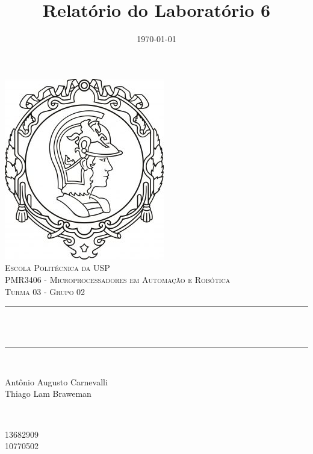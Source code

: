 \documentclass{article}
\title{Relatório do Laboratório 6}								%
\author{} %
\date{\today}											%
\makeatletter
\let\thetitle\@title
\let\thedate\@date
\makeatother
\begin{document}

\begin{titlepage}
	\centering
    \vspace*{0.2 cm}
    \includegraphics[scale = 0.8]{logoPoli.jpg}\\[1.0 cm]	%
    \textsc{\LARGE \newline\newline Escola Politécnica da USP}\\[1.5 cm]	%
    \textsc{\Large PMR3406 - Microprocessadores em Automação e Robótica}\\[0.5 cm] %
    \textsc{\Large Turma 03 - Grupo 02}\\[0.5 cm]
	
	\rule{\linewidth}{0.2 mm} \\[0.4 cm]
	{ \huge \bfseries \thetitle}\\ 
	\rule{\linewidth}{0.2 mm} \\[1 cm]
	
	\begin{minipage}{0.5\textwidth}
		\begin{flushleft} \large

            Antônio Augusto Carnevalli\\
			Thiago Lam Braweman\\

			
			\end{flushleft}
	\end{minipage}~
	\begin{minipage}{0.5\textwidth}
            
		\begin{flushright} \large

            13682909\\
			10770502\\

		    
		    \end{flushright}
        
	\end{minipage}\\~
	\vfill
	\thedate
	
    
\end{titlepage}
\end{document}
